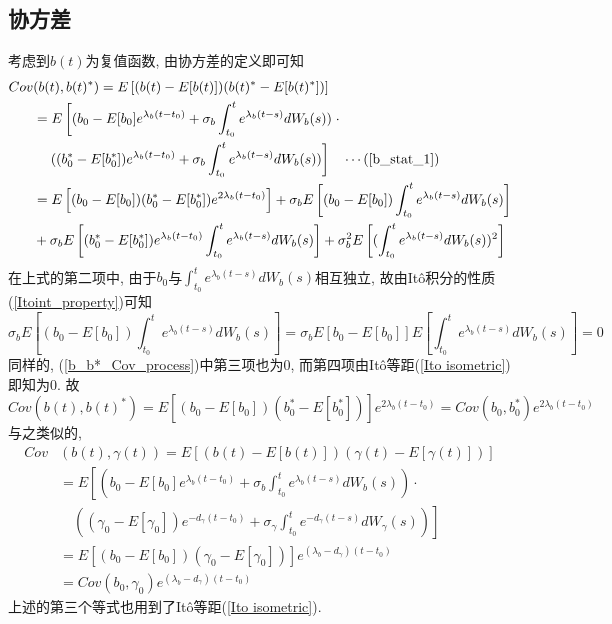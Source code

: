 \documentclass[notitlepage,cs4size,punct,oneside]{ctexrep}
\numberwithin{equation}{section}
\theoremstyle{mystyle}
\begin{document}
\subsection{协方差}
考虑到$b(t)$为复值函数, 由协方差的定义\cite{shuyuanhe2006probability}即可知
\begin{equation} \label{b_b*_Cov_process}
\begin{split}
Cov&(b(t), b(t)^*) = E\left[(b(t) - E[b(t)])(b(t)^* - E[b(t)^*])\right] \\
&= E\left[(b_0 - E[b_0]e^{\lambda_b (t-t_0)}+\sigma_b\int_{t_0}^{t} e^{\lambda_b (t-s)}dW_b(s))\right. \cdot \\
&\quad \left.((b_0^* - E[b_0^*])e^{\lambda_b(t-t_0)}+\sigma_b\int_{t_0}^t e^{\lambda_b (t-s)}dW_b(s))\right] \quad\cdots(\ref{b_stat_1}) \\
&= E\left[(b_0 - E[b_0])(b_0^* - E[b_0^*])e^{2\lambda_b (t-t_0)}\right] + \sigma_bE\left[(b_0 - E[b_0])\int_{t_0}^{t}e^{\lambda_b(t-s)}dW_b(s)\right]\\
&+ \sigma_bE\left[(b_0^*-E[b_0^*])e^{\lambda_b(t-t_0)}\int_{t_0}^{t}e^{\lambda_b(t-s)}dW_b(s)\right] + \sigma_b^2E\left[(\int_{t_0}^{t}e^{\lambda_b(t-s)}dW_b(s))^2\right]
\end{split}
\end{equation}
在上式的第二项中, 由于$b_0$与$\int_{t_0}^{t} e^{\lambda_b (t-s)}dW_b(s)$相互独立, 故由It\^{o}积分的性质(\ref{Itoint_property})可知
\begin{equation}
\sigma_bE\left[(b_0 - E[b_0])\int_{t_0}^{t}e^{\lambda_b(t-s)}dW_b(s)\right] = \sigma_bE\left[b_0 - E[b_0]\right]E\left[\int_{t_0}^{t}e^{\lambda_b(t-s)}dW_b(s)\right] = 0
\end{equation}
同样的, (\ref{b_b*_Cov_process})中第三项也为0, 而第四项由It\^{o}等距(\ref{Ito isometric})即知为0. 故
\begin{equation} \label{b_b*_Cov}
Cov(b(t), b(t)^*) = E[(b_0-E[b_0])(b_0^*-E[b_0^*])]e^{2\lambda_b(t-t_0)} = Cov(b_0, b_0^*)e^{2\lambda_b(t-t_0)}
\end{equation}
与之类似的,
\begin{equation} \label{b_gamma_Cov}
\begin{split}
Cov&(b(t), \gamma(t)) = E[(b(t) - E[b(t)])(\gamma(t)-E[\gamma(t)])] \\
&= E\left[\left(b_0 - E[b_0]e^{\lambda_b (t-t_0)}+\sigma_b\int_{t_0}^{t} e^{\lambda_b (t-s)}dW_b(s)\right)\right. \cdot \\
&\quad \left.\left((\gamma_0-E[\gamma_0])e^{-d_\gamma(t-t_0)}+\sigma_\gamma \int_{t_0}^{t} e^{-d_\gamma(t-s)}dW_\gamma(s)\right)\right] \\
&= E\left[(b_0-E[b_0])(\gamma_0-E[\gamma_0])\right]e^{(\lambda_b-d_\gamma)(t-t_0)} \\
&= Cov(b_0, \gamma_0)e^{(\lambda_b-d_\gamma)(t-t_0)}
\end{split}
\end{equation}
上述的第三个等式也用到了It\^{o}等距(\ref{Ito isometric}).
\end{document}
